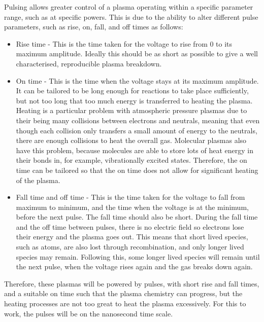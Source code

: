 \documentclass[11pt, oneside]{article}   	%
\newcommand{\todo}[1]{ \textcolor{red}{\bf{To Do:} #1}}
\begin{document}
Pulsing allows greater control of a plasma operating within a specific parameter range, such as at specific powers.
This is due to the ability to alter different pulse parameters, such as rise, on, fall, and off times as follows:
\begin{itemize}
\item Rise time - This is the time taken for the voltage to rise from 0 to its maximum amplitude. 
Ideally this should be as short as possible to give a well characterised, reproducible plasma breakdown.
\item On time - This is the time when the voltage stays at its maximum amplitude. 
It can be tailored to be long enough for reactions to take place sufficiently, but not too long that too much energy is transferred to heating the plasma. 
Heating is a particular problem with atmospheric pressure plasmas due to their being many collisions between electrons and neutrals, meaning that even though each collision only transfers a small amount of energy to the neutrals, there are enough collisions to heat the overall gas. 
Molecular plasmas also have this problem, because molecules are able to store lots of heat energy in their bonds in, for example, vibrationally excited states.
Therefore, the on time can be tailored so that the on time does not allow for significant heating of the plasma.
\item Fall time and off time - This is the time taken for the voltage to fall from maximum to minimum, and the time when the voltage is at the minimum, before the next pulse. The fall time should also be short. 
During the fall time and the off time between pulses, there is no electric field so electrons lose their energy and the plasma goes out. 
This means that short lived species, such as atoms, are also lost through recombination, and only longer lived species may remain. 
Following this, some longer lived species will remain until the next pulse, when the voltage rises again and the gas breaks down again.
\end{itemize}

Therefore, these plasmas will be powered by pulses, with short rise and fall times, and a suitable on time such that the plasma chemistry can progress, but the heating processes are not too great to heat the plasma excessively.
For this to work, the pulses will be on the nanosecond time scale.

\end{document}
